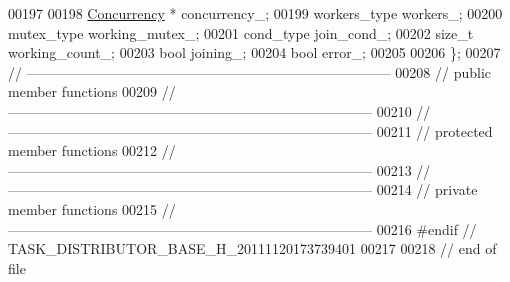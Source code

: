 \begin{DoxyCode}
00197 
00198     \hyperlink{classhryky_1_1task_1_1_concurrency}{Concurrency} *               concurrency\_;
00199     workers\_type                workers\_;
00200     mutex\_type                  working\_mutex\_;
00201     cond\_type                   join\_cond\_;
00202     \textcolor{keywordtype}{size\_t}                      working\_count\_;
00203     \textcolor{keywordtype}{bool}                        joining\_;
00204     \textcolor{keywordtype}{bool}                        error\_;
00205 
00206 \};
00207 \textcolor{comment}{//
      ------------------------------------------------------------------------------}
00208 \textcolor{comment}{// public member functions}
00209 \textcolor{comment}{//
      ------------------------------------------------------------------------------}
00210 \textcolor{comment}{//
      ------------------------------------------------------------------------------}
00211 \textcolor{comment}{// protected member functions}
00212 \textcolor{comment}{//
      ------------------------------------------------------------------------------}
00213 \textcolor{comment}{//
      ------------------------------------------------------------------------------}
00214 \textcolor{comment}{// private member functions}
00215 \textcolor{comment}{//
      ------------------------------------------------------------------------------}
00216 \textcolor{preprocessor}{#endif // TASK\_DISTRIBUTOR\_BASE\_H\_20111120173739401}
00217 \textcolor{preprocessor}{}
00218 \textcolor{comment}{// end of file}
\end{DoxyCode}
